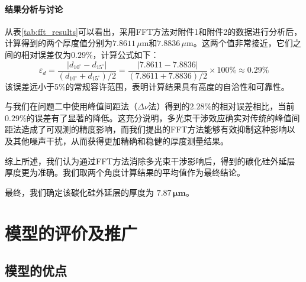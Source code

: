 \documentclass[withoutpreface,bwprint]{cumcmthesis} %
\begin{document}
\paragraph{结果分析与讨论}
从表\ref{tab:fft_results}可以看出，采用FFT方法对附件1和附件2的数据进行分析后，计算得到的两个厚度值分别为$7.8611\,\mu\text{m}$和$7.8836\,\mu\text{m}$。这两个值非常接近，它们之间的相对误差仅为$0.29\%$，计算公式如下：
$$ \varepsilon_d = \frac{|d_{10^\circ} - d_{15^\circ}|}{(d_{10^\circ} + d_{15^\circ})/2} = \frac{|7.8611 - 7.8836|}{(7.8611 + 7.8836)/2} \times 100\% \approx 0.29\% $$
该误差远小于5\%的常规容许范围，表明计算结果具有高度的自洽性和可靠性。

与我们在问题二中使用峰值间距法（$\Delta\nu$法）得到的$2.28\%$的相对误差相比，当前$0.29\%$的误差有了显著的降低。这充分说明，多光束干涉效应确实对传统的峰值间距法造成了可观测的精度影响，而我们提出的FFT方法能够有效抑制这种影响以及其他噪声干扰，从而获得更加精确和稳健的厚度测量结果。

综上所述，我们认为通过FFT方法消除多光束干涉影响后，得到的碳化硅外延层厚度更为准确。我们取两个角度计算结果的平均值作为最终结论。

最终，我们确定该碳化硅外延层的厚度为 $\mathbf{7.87\,\mu m}$。
\section{模型的评价及推广}

\subsection{模型的优点}
\end{document}
